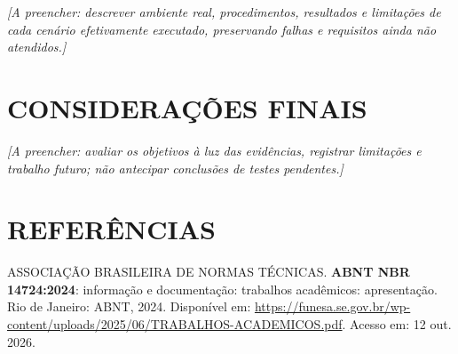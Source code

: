 \documentclass[12pt,oneside,openany,a4paper,english,brazil]{abntex2}
\newcommand{\pendente}[1]{\textit{[A preencher: #1.]}}
\newcommand{\referencia}[1]{\noindent #1\par\vspace{\baselineskip}}
\begin{document}
\pendente{descrever ambiente real, procedimentos, resultados e limitações
de cada cenário efetivamente executado, preservando falhas e requisitos
ainda não atendidos}

\chapter{CONSIDERAÇÕES FINAIS}
\pendente{avaliar os objetivos à luz das evidências, registrar limitações
e trabalho futuro; não antecipar conclusões de testes pendentes}

\postextual
\chapter*{REFERÊNCIAS}
\begin{SingleSpace}
  \referencia{ASSOCIAÇÃO BRASILEIRA DE NORMAS TÉCNICAS.
    \textbf{ABNT NBR 14724:2024}: informação e documentação:
    trabalhos acadêmicos: apresentação. Rio de Janeiro: ABNT, 2024.
    Disponível em:
    \url{https://funesa.se.gov.br/wp-content/uploads/2025/06/TRABALHOS-ACADEMICOS.pdf}.
    Acesso em: 12 out. 2026.}
\end{SingleSpace}

\end{document}
